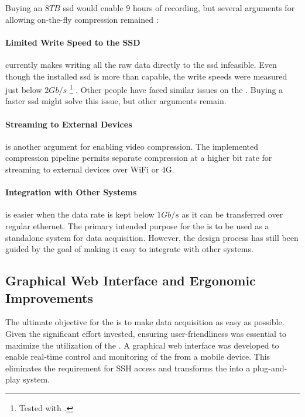 Buying an $8TB$ \gls{ssd} would enable 9 hours of recording, but several arguments for allowing on-the-fly compression remained \cite{CorsairMP600PRO}:

\paragraph{Limited Write Speed to the SSD} currently makes writing all the raw data directly to the \gls{ssd} infeasible.
Even though the installed \gls{ssd} is more than capable, the write speeds were measured just below $2Gb/s$
\footnote{Tested with .}
\cite{microntechnologyMicron2300SSD2020}.
Other people have faced similar issues on the \jx \cite{dtyuImbalancedPerformanceRead2018}.
Buying a faster \gls{ssd} might solve this issue, but other arguments remain.

\paragraph{Streaming to External Devices} is another argument for enabling video compression.
The implemented compression pipeline permits separate compression at a higher bit rate for streaming to external devices over WiFi or 4G.

\paragraph{Integration with Other Systems} is easier when the data rate is kept below $1Gb/s$ as it can be transferred over regular ethernet.
The primary intended purpose for the \sr is to be used as a standalone system for data acquisition.
However, the design process has still been guided by the goal of making it easy to integrate with other systems.

\subsection{Graphical Web Interface and Ergonomic Improvements}
The ultimate objective for the \sr is to make data acquisition as easy as possible.
Given the significant effort invested, ensuring user-friendliness was essential to maximize the utilization of the \sr.
A graphical web interface was developed to enable real-time control and monitoring of the \sr from a mobile device.
This eliminates the requirement for SSH access and transforms the \sr into a plug-and-play system.

